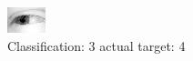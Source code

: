 \begin{figure}[h!]
\begin{center}
\includegraphics[width=0.60\columnwidth]{figures/ID2510_class_3_target_4.png}
\end{center}
\caption{ Classification: 3 actual target: 4}
\label{fig:ID2510_class_3_target_4}
\end{figure}

